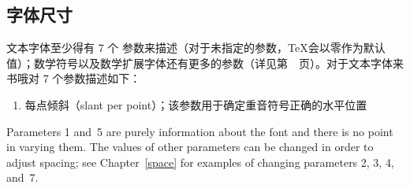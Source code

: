\documentclass{book}
\begin{document}
\subsection{字体尺寸}
\label{font:dims}

文本字体至少得有 7 个  参数来描述（对于未指定的参数，\TeX 会以零作为默认值）；数学符号以及数学扩展字体还有更多的参数（详见第~\pageref{fam23:fontdims}~页）。对于文本字体来书哦对 7 个参数描述如下：
\begin{enumerate}
\item 每点倾斜（slant per point）；该参数用于确定重音符号正确的水平位置
\end{enumerate}

Parameters 1 and~5 are purely information about the font
and there is no point in varying them.
The values of other parameters can be changed in order to
adjust spacing; see Chapter~\ref{space} for examples
of changing parameters 2, 3, 4, and~7.
\end{document}
